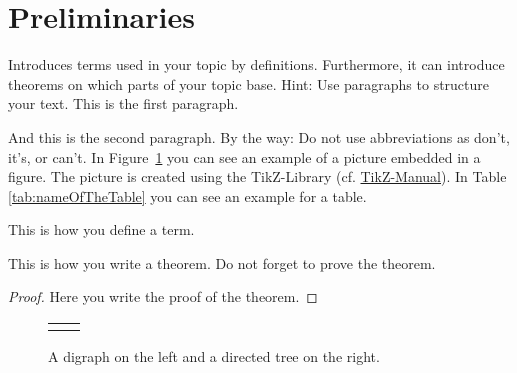 \section{Preliminaries}
\label{sec:preliminaries}
Introduces terms used in your topic by definitions. Furthermore, it 
can introduce theorems on which parts of your topic base. Hint: Use 
paragraphs to structure your text. This is the first paragraph.

And this is the second paragraph. By the way: Do not use 
abbreviations as don't, it's, or can't. In Figure~\ref{fig:graph} 
you can see an example of a picture embedded in a figure. The
picture is created using the TikZ-Library (cf. 
\href{../manuals/tikzpgfmanual.pdf}{TikZ-Manual}). In Table
\ref{tab:nameOfTheTable} you can see an example for a table.

\begin{definition}
\label{def:nameOfTerm}
This is how you define a term.
\end{definition}

\begin{theorem}
\label{the:nameOfTheorem}
This is how you write a theorem. Do not forget to prove the theorem.
\begin{proof}
	Here you write the proof of the theorem.
\end{proof}
\end{theorem}

\begin{figure}[htb] %
	\begin{center}
		\begin{tabular}{cc}
			\begin{minipage}{0.35\linewidth} %
				\begin{center}
					
				\end{center}
			\end{minipage}
			&
			\begin{minipage}{0.55\linewidth} %
				\begin{center}
					
				\end{center}
			\end{minipage}
		\end{tabular}
	\end{center}
	\caption{A digraph on the left and a directed tree on the right.}
	\label{fig:graph}
\end{figure}

